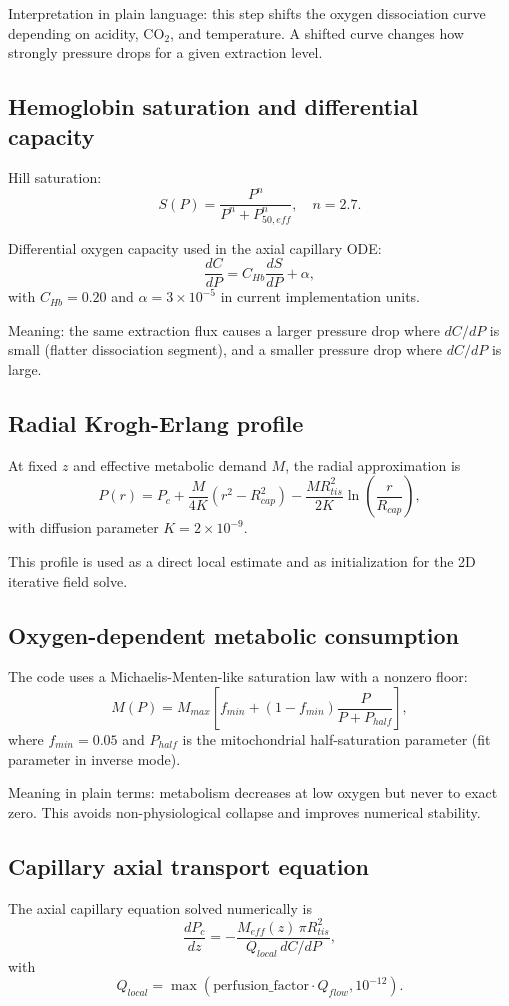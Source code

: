 \documentclass[12pt,a4paper]{article}
\begin{document}
Interpretation in plain language: this step shifts the oxygen dissociation curve depending on acidity, CO$_2$, and temperature. A shifted curve changes how strongly pressure drops for a given extraction level.

\subsection{Hemoglobin saturation and differential capacity}
Hill saturation:
\[
S(P)=\frac{P^n}{P^n+P_{50,eff}^n}, \quad n=2.7.
\]

Differential oxygen capacity used in the axial capillary ODE:
\[
\frac{dC}{dP}=C_{Hb}\frac{dS}{dP}+\alpha,
\]
with $C_{Hb}=0.20$ and $\alpha=3\times10^{-5}$ in current implementation units.

Meaning: the same extraction flux causes a larger pressure drop where $dC/dP$ is small (flatter dissociation segment), and a smaller pressure drop where $dC/dP$ is large.

\subsection{Radial Krogh-Erlang profile}
At fixed $z$ and effective metabolic demand $M$, the radial approximation is
\[
P(r)=P_c + \frac{M}{4K}(r^2-R_{cap}^2) - \frac{MR_{tis}^2}{2K}\ln\left(\frac{r}{R_{cap}}\right),
\]
with diffusion parameter $K=2\times10^{-9}$.

This profile is used as a direct local estimate and as initialization for the 2D iterative field solve.

\subsection{Oxygen-dependent metabolic consumption}
The code uses a Michaelis-Menten-like saturation law with a nonzero floor:
\[
M(P)=M_{max}\left[f_{min} + (1-f_{min})\frac{P}{P+P_{half}}\right],
\]
where $f_{min}=0.05$ and $P_{half}$ is the mitochondrial half-saturation parameter (fit parameter in inverse mode).

Meaning in plain terms: metabolism decreases at low oxygen but never to exact zero. This avoids non-physiological collapse and improves numerical stability.

\subsection{Capillary axial transport equation}
The axial capillary equation solved numerically is
\[
\frac{dP_c}{dz}=-\frac{M_{eff}(z)\,\pi R_{tis}^2}{Q_{local}\,dC/dP},
\]
with
\[
Q_{local}=\max(\text{perfusion\_factor}\cdot Q_{flow},10^{-12}).
\]
\end{document}
